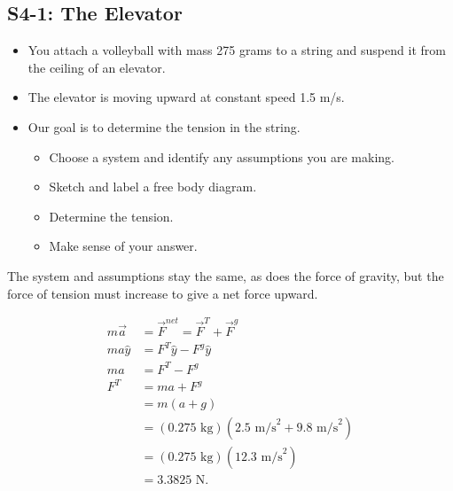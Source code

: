 \documentclass[]{article}
\begin{document}
\begin{PresentSpace}
\vspace{-10pt}
\section*{S4-1: The Elevator}
\vspace{-10pt}
\begin{itemize}
	\item You attach a volleyball with mass 275 grams to a string and suspend it from the ceiling of an elevator.
	\item The elevator is moving upward at constant speed 1.5 m/s.
	\item Our goal is to determine the tension in the string.
	\begin{itemize}
		\item Choose a system and identify any assumptions you are making.
		\item Sketch and label a free body diagram.
		\item Determine the tension.
		\item Make sense of your answer.
	\end{itemize}
\end{itemize}
\end{PresentSpace}
\newpage
\begin{TeacherMargin}
\noindent The system and assumptions stay the same, as does the force of gravity, but the force of tension must increase to give a net force upward.
\begin{center}
\end{center}
\begin{align*}
	m\vec{a} & = \vec{F}^{net} = \vec{F}^{T}+\vec{F}^{g} \\
	ma\hat{y} & = F^{T}\hat{y}-F^{g}\hat{y} \\
	ma & = F^{T} - F^{g} \\
	F^{T} & = ma+F^{g} \\
	& = m(a+g) \\
	& = (0.275\text{ kg})(2.5\text{ m/s}^{2}+9.8\text{ m/s}^{2}) \\
	& = (0.275\text{ kg})(12.3\text{ m/s}^{2}) \\
	& = 3.3825\text{ N}.
\end{align*}
\end{TeacherMargin}
\end{document}

